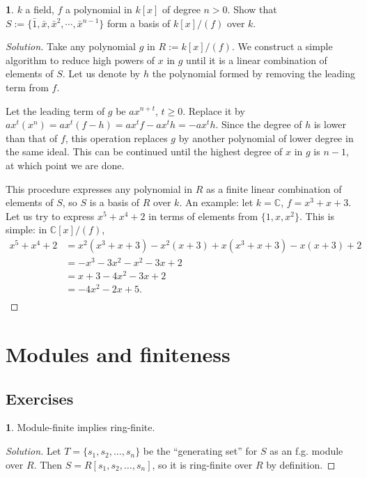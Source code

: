 \documentclass{book}
\newcommand{\C}{\mathbb C}
\theoremstyle{definition}
\theoremstyle{block}
\newtheorem{block*}[block]{}
\theoremstyle{thm}
\begin{document}
\begin{block*}
  $k$ a field, $f$ a polynomial in $k[x]$ of degree $n>0$. Show that
  $S:=\{\bar{1},\bar x,\bar{x}^2,\cdots,\bar{x}^{n-1}\}$ form a basis of $k[x]/(f)$ over $k$.
\end{block*}
\begin{proof}[Solution]
  Take any polynomial $g$ in $R:=k[x]/(f)$. We construct a simple algorithm to
  reduce high powers of $x$ in $g$ until it is a linear combination of elements
  of $S$. Let us denote by $h$ the polynomial formed by removing the leading
  term from $f$.\par
  Let the leading term of $g$ be $ax^{n+t}$, $t\geq 0$. Replace it by
  $ax^t(x^n) = ax^t(f-h)=ax^tf-ax^th=-ax^th$. Since the degree of $h$ is lower
  than that of $f$, this operation replaces $g$ by another polynomial of lower
  degree in the same ideal. This can be continued until the highest degree of
  $x$ in $g$ is $n-1$, at which point we are done.\par
  This procedure expresses any polynomial in $R$ as a finite linear combination
  of elements of $S$, so $S$ is a basis of $R$ over $k$.
  An example: let $k=\C$, $f=x^3+x+3$. Let us try to express $x^5+x^4+2$ in
  terms of elements from $\{1,x,x^2\}$. This is simple: in $\C[x]/(f)$,
  \begin{align*}
    x^5+x^4+2 &= x^2(x^3+x+3)-x^2(x+3) + x(x^3+x+3) - x(x+3) + 2\\
              &= - x^3 - 3x^2 - x^2 - 3x + 2\\
              &= x + 3 - 4x^2 - 3x + 2\\
              &= -4x^2 - 2x + 5.\\
  \end{align*}
\end{proof}

\section{Modules and finiteness}

\subsection{Exercises}

\begin{block*}
  Module-finite implies ring-finite.
\end{block*}
\begin{proof}[Solution]
  Let $T = \{s_1,s_2,\ldots,s_n\}$ be the ``generating set'' for $S$ as an f.g.
  module over $R$. Then $S = R[s_1,s_2,\ldots,s_n]$, so it is ring-finite over
  $R$ by definition. 
\end{proof}
\end{document}
